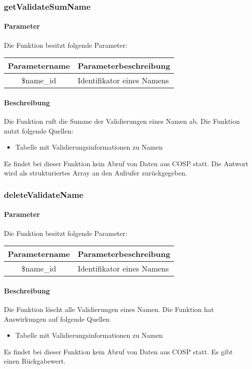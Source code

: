 \subsubsection{getValidateSumName}
\paragraph{Parameter} Die Funktion besitzt folgende Parameter:
\begin{table}[H]
	\begin{tabular}{|c|p{11cm}|}
		\hline
		\textbf{Parametername} & \textbf{Parameterbeschreibung} \\ \hline
		\$name\_id & Identifikator eines Namens \\ \hline
	\end{tabular}
\end{table}
\paragraph{Beschreibung} Die Funktion ruft die Summe der Validierungen eines Namen ab. Die Funktion nutzt folgende Quellen:
\begin{itemize}
	\item Tabelle mit Validierungsinformationen zu Namen
\end{itemize}
Es findet bei dieser Funktion kein Abruf von Daten aus {\glqq COSP\grqq} statt. Die Antwort wird als strukturiertes Array an den Aufrufer zurückgegeben.
\subsubsection{deleteValidateName}
\paragraph{Parameter} Die Funktion besitzt folgende Parameter:
\begin{table}[H]
	\begin{tabular}{|c|p{11cm}|}
		\hline
		\textbf{Parametername} & \textbf{Parameterbeschreibung} \\ \hline
		\$name\_id & Identifikator eines Namens \\ \hline
	\end{tabular}
\end{table}
\paragraph{Beschreibung} Die Funktion löscht alle Validierungen eines Namen. Die Funktion hat Auswirkungen auf folgende Quellen
\begin{itemize}
	\item Tabelle mit Validierungsinformationen zu Namen
\end{itemize}
Es findet bei dieser Funktion kein Abruf von Daten aus {\glqq COSP\grqq} statt. Es gibt einen Rückgabewert.
